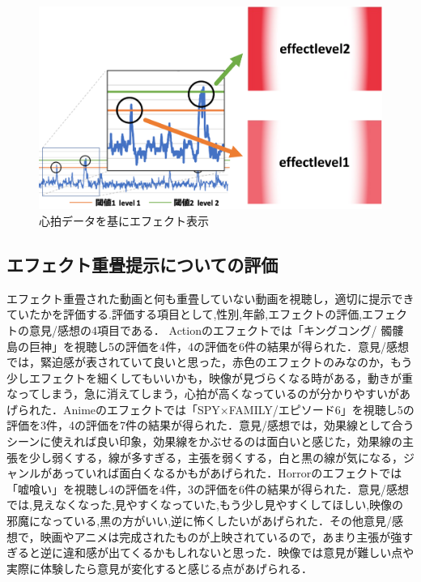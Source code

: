 \begin{figure}[H]
   \centering
   \includegraphics[width=13cm]{images/chapter4/effectupp.pdf}
   \caption{心拍データを基にエフェクト表示}
   \label{efecthyouka}
\end{figure}
 
\subsection{エフェクト重畳提示についての評価}
 
エフェクト重畳された動画と何も重畳していない動画を視聴し，適切に提示できていたかを評価する.評価する項目として,性別,年齢,エフェクトの評価,エフェクトの意見/感想の4項目である．
Actionのエフェクトでは「キングコング/ 髑髏島の巨神」を視聴し5の評価を4件，4の評価を6件の結果が得られた．意見/感想では，緊迫感が表されていて良いと思った，赤色のエフェクトのみなのか，もう少しエフェクトを細くしてもいいかも，映像が見づらくなる時がある，動きが重なってしまう，急に消えてしまう，心拍が高くなっているのが分かりやすいがあげられた．Animeのエフェクトでは「SPY×FAMILY/エピソード6」を視聴し5の評価を3件，4の評価を7件の結果が得られた．意見/感想では，効果線として合うシーンに使えれば良い印象，効果線をかぶせるのは面白いと感じた，効果線の主張を少し弱くする，線が多すぎる，主張を弱くする，白と黒の線が気になる，ジャンルがあっていれば面白くなるかもがあげられた．Horrorのエフェクトでは「嘘喰い」を視聴し4の評価を4件，3の評価を6件の結果が得られた．意見/感想では,見えなくなった,見やすくなっていた,もう少し見やすくしてほしい,映像の邪魔になっている,黒の方がいい,逆に怖くしたいがあげられた．その他意見/感想で，映画やアニメは完成されたものが上映されているので，あまり主張が強すぎると逆に違和感が出てくるかもしれないと思った．映像では意見が難しい点や実際に体験したら意見が変化すると感じる点があげられる．
 
